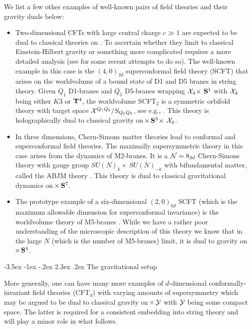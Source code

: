 \documentclass[12pt,openany]{book}
\makeatletter
\renewcommand\section{\@startsection {section}{1}{\z@}%
                                   {-3.5ex \@plus -1ex \@minus -.2ex}%
                                   {2.3ex \@plus.2ex}%
                                   {\normalfont\large\bfseries}}
\makeatother
\begin{document}
We list a few other examples of well-known pairs of field theories and their gravity duals below:
\begin{itemize}
\item Two-dimensional CFTs with large central charge $c \gg 1$ are expected to be dual to classical theories on . To ascertain whether they limit to classical Einstein-Hilbert gravity or something more complicated requires a more detailed analysis (see \cite{Hartman:2014oaa,Haehl:2014yla,Belin:2014fna,Belin:2015hwa} for some recent attempts to do so). The well-known example in this case is the $(4,0)_{2d}$ superconformal field theory (SCFT) that arises on the worldvolume of a bound state of D1 and D5 branes in string theory.
Given $Q_1$ D1-branes and $Q_5$ D5-branes wrapping ${\cal X}_4 \!\times \,{\bf S}^1$ with ${\cal X}_4$ being either $K3$ or ${\bf T}^4$, the worldvolume SCFT$_2$ is a symmetric orbifold theory with target space ${\cal X}^{Q_1Q_5}/S_{Q_1Q_5}$, see e.g., \cite{Seiberg:1999xz}. This theory is holographically dual to classical gravity on  $\!\times \,{\bf S}^3 \!\times \,{\cal X}_4$.
\item In three dimensions, Chern-Simons matter theories lead to conformal and superconformal field theories. The maximally supersymmetric theory in this case arises from the dynamics of M2-branes. It is a ${\cal N} = 8_{3d}$ Chern-Simons theory with gauge group $SU(N)_k \!\times \,SU(N)_{-k}$ with bifundamental matter,  called the ABJM theory \cite{Aharony:2008ug}. This theory is dual to classical gravitational dynamics on  $\!\times \,{\bf S}^7$.
\item The prototype example of a six-dimensional $(2,0)_{6d} $ SCFT (which is the maximum allowable dimension for superconformal invariance) is the worldvolume theory of M5-branes \cite{Seiberg:1997ax}. While we have a rather poor understanding of the microscopic description of this theory we know that in the large $N$ (which is the number of M5-branes) limit, it is dual to gravity on  $\!\times \,{\bf S}^4$.
\end{itemize}


\section{The gravitational setup}
\label{sec:gravcon}

More generally, one can have many more examples of $d$-dimensional conformally-invariant field theories (CFT$_d$) with varying amounts of supersymmetry which may be argued to be dual to classical gravity on  $\!\times \,{\cal Y}$ with
${\cal Y}$ being some compact space. The latter is required for a consistent embedding into string theory and will play a minor role in what follows.
\end{document}
